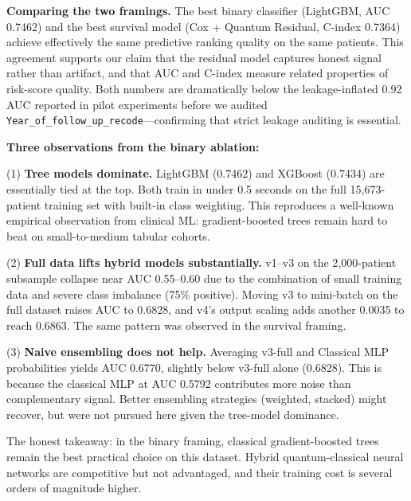 \documentclass[12pt, letterpaper]{article}
\begin{document}
\textbf{Comparing the two framings.} The best binary classifier (LightGBM, AUC 0.7462) and the best survival model (Cox + Quantum Residual, C-index 0.7364) achieve effectively the same predictive ranking quality on the same patients. This agreement supports our claim that the residual model captures honest signal rather than artifact, and that AUC and C-index measure related properties of risk-score quality. Both numbers are dramatically below the leakage-inflated 0.92 AUC reported in pilot experiments before we audited \texttt{Year\_of\_follow\_up\_recode}---confirming that strict leakage auditing is essential.

\textbf{Three observations from the binary ablation:}

(1) \textbf{Tree models dominate.} LightGBM (0.7462) and XGBoost (0.7434) are essentially tied at the top. Both train in under 0.5 seconds on the full 15{,}673-patient training set with built-in class weighting. This reproduces a well-known empirical observation from clinical ML: gradient-boosted trees remain hard to beat on small-to-medium tabular cohorts.

(2) \textbf{Full data lifts hybrid models substantially.} v1--v3 on the 2{,}000-patient subsample collapse near AUC 0.55--0.60 due to the combination of small training data and severe class imbalance (75\% positive). Moving v3 to mini-batch on the full dataset raises AUC to 0.6828, and v4's output scaling adds another 0.0035 to reach 0.6863. The same pattern was observed in the survival framing.

(3) \textbf{Naive ensembling does not help.} Averaging v3-full and Classical MLP probabilities yields AUC 0.6770, slightly below v3-full alone (0.6828). This is because the classical MLP at AUC 0.5792 contributes more noise than complementary signal. Better ensembling strategies (weighted, stacked) might recover, but were not pursued here given the tree-model dominance.

The honest takeaway: in the binary framing, classical gradient-boosted trees remain the best practical choice on this dataset. Hybrid quantum-classical neural networks are competitive but not advantaged, and their training cost is several orders of magnitude higher.
\end{document}
